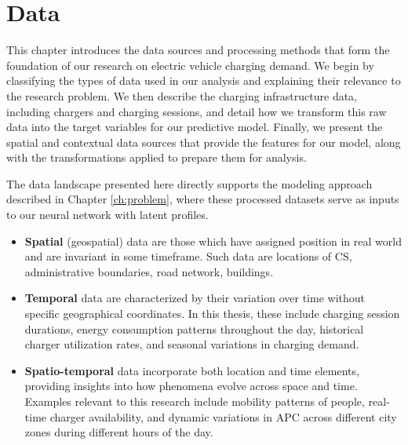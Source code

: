 \setchapterpreamble[u]{\margintoc}
\chapter{Data}
\label{ch:data}


This chapter introduces the data sources and processing methods that form the foundation of our research on electric vehicle charging demand. We begin by classifying the types of data used in our analysis and explaining their relevance to the research problem. We then describe the charging infrastructure data, including chargers and charging sessions, and detail how we transform this raw data into the target variables for our predictive model. Finally, we present the spatial and contextual data sources that provide the features for our model, along with the transformations applied to prepare them for analysis.


The data landscape presented here directly supports the modeling approach described in Chapter \ref{ch:problem}, where these processed datasets serve as inputs to our neural network with latent profiles.

\begin{kaobox}[frametitle=Types of data]

    \begin{itemize}
        \item \textbf{Spatial} (geospatial) data are those which have assigned position in real world and are invariant in some timeframe. Such data are locations of \acrlong{CS}, administrative boundaries, road network, buildings.
        \item \textbf{Temporal} data are characterized by their variation over time without specific geographical coordinates. In this thesis, these include charging session durations, energy consumption patterns throughout the day, historical charger utilization rates, and seasonal variations in charging demand.
        \item \textbf{Spatio-temporal} data incorporate both location and time elements, providing insights into how phenomena evolve across space and time. Examples relevant to this research include mobility patterns of people, real-time charger availability, and dynamic variations in \acrshort{APC} across different city zones during different hours of the day.
    \end{itemize}
\end{kaobox}

